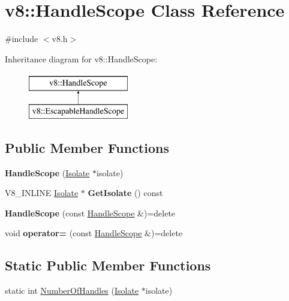 \hypertarget{classv8_1_1HandleScope}{}\section{v8\+:\+:Handle\+Scope Class Reference}
\label{classv8_1_1HandleScope}


{\ttfamily \#include $<$v8.\+h$>$}

Inheritance diagram for v8\+:\+:Handle\+Scope\+:\begin{figure}[H]
\begin{center}
\leavevmode
\includegraphics[height=2.000000cm]{classv8_1_1HandleScope}
\end{center}
\end{figure}
\subsection*{Public Member Functions}
\begin{DoxyCompactItemize}
\item 
\mbox{\label{classv8_1_1HandleScope_afdb3053d852ea467f026b025ed431e79}} 
{\bfseries Handle\+Scope} (\mbox{\hyperlink{classv8_1_1Isolate}{Isolate}} $\ast$isolate)
\item 
\mbox{\label{classv8_1_1HandleScope_ad605be00a8f9bfd8157806102af95fab}} 
V8\+\_\+\+I\+N\+L\+I\+NE \mbox{\hyperlink{classv8_1_1Isolate}{Isolate}} $\ast$ {\bfseries Get\+Isolate} () const
\item 
\mbox{\label{classv8_1_1HandleScope_a8354f068f3185cb663ecb689587fbbe8}} 
{\bfseries Handle\+Scope} (const \mbox{\hyperlink{classv8_1_1HandleScope}{Handle\+Scope}} \&)=delete
\item 
\mbox{\label{classv8_1_1HandleScope_a6570b4a527ee30057026a15f3ebe62b2}} 
void {\bfseries operator=} (const \mbox{\hyperlink{classv8_1_1HandleScope}{Handle\+Scope}} \&)=delete
\end{DoxyCompactItemize}
\subsection*{Static Public Member Functions}
\begin{DoxyCompactItemize}
\item 
static int \mbox{\hyperlink{classv8_1_1HandleScope_abab7214c9b9388b02f575fd5270b7e2f}{Number\+Of\+Handles}} (\mbox{\hyperlink{classv8_1_1Isolate}{Isolate}} $\ast$isolate)
\end{DoxyCompactItemize}
